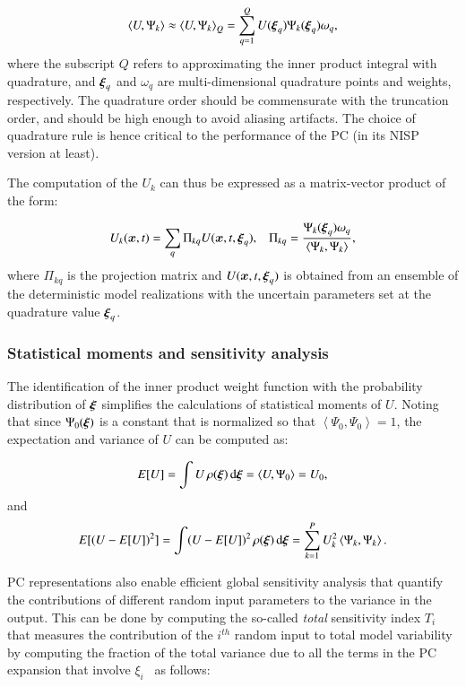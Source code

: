 \begin{equation}
  \left< U, \Psi_k \right> 
\approx \left< U, \Psi_k \right>_Q
= \sum_{q=1}^Q U(\xxi_q) \Psi_k(\xxi_q) \omega_q,
\end{equation}
where the subscript $Q$ refers to approximating the inner product integral with
quadrature, and $\xxi_q$ and $\omega_q$ are multi-dimensional quadrature points and weights,
respectively. The quadrature order should be commensurate with the
truncation order, and should be high enough to avoid aliasing artifacts.
The choice of quadrature rule is hence critical to the performance
of the PC (in its NISP version at least).

The computation of the ${U}_k$ can thus be expressed as a matrix-vector product of the form:

\begin{equation} 
 U_k(\bm{x},t)=\sum_q \Pi_{kq} U(\bm{x},t,\xxi_q),\;\;\;
 \Pi_{kq}=\frac{\Psi_k(\xxi_q)\omega_q}{\left< \Psi_k, \Psi_k \right>},
\label{eq:nisp}
\end{equation} 
where $\Pi_{kq}$ is the projection matrix and $U(\bm{x},t,\xxi_q)$ is obtained
from an ensemble of the deterministic model realizations with the uncertain parameters set at
the quadrature value $\xxi_q$. 


\subsubsection{Statistical moments and sensitivity analysis}
The identification of the inner product weight function
with the probability distribution of $\xxi$ simplifies the calculations of statistical moments of $U$. 
Noting that since $\Psi_0(\xxi)$ is a constant that is normalized so that 
$\left<\Psi_0,\Psi_0\right>=1$, the expectation and variance of $U$ can be computed as:

\begin{equation}
 E[U] = \int U \, \rho(\xxi) \, \mbox{d}\xxi=\left< U,\Psi_0\right> = U_0,  
 \label{eq:mean}
\end{equation}
and \begin{equation}
 E[(U-E[U])^2] = \int (U-E[U])^2 \, \rho(\xxi) \, \mbox{d}\xxi=\sum_{k=1}^P U_k^2
 \label{eq:sigma}
\left<\Psi_k,\Psi_k\right>.
\end{equation}

PC representations also enable
efficient global sensitivity analysis that quantify the
contributions of different random input parameters to the variance in the output.
This can be done by computing the so-called {\it total} 
sensitivity index $T_i$ that measures the contribution of
the $i^{th}$ random input to total model variability by
computing the fraction of the total variance due to all the terms in the
PC expansion that involve $\xi_i$~\citep{LeMaitreKnio2010,Crestaux,Sudret}
as follows:

